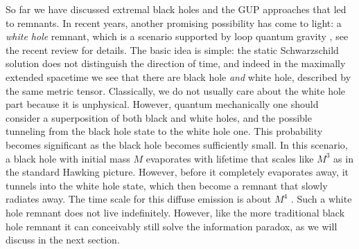 \documentclass[preprintnumbers, floatfix, preprintnumbers, letterpaper, twocolumn, superscriptaddress,nofootinbib]{revtex4-2}
\begin{document}
So far we have discussed extremal black holes and the GUP approaches that led to remnants. In recent years, another promising possibility has come to light: a \emph{white hole} remnant, which is a scenario supported by loop quantum gravity \cite{1801.03027,1802.04264,1805.03872,1905.07251,2009.05016,2105.06876,2207.06978}, see the recent review \cite{2407.09584} for details. The basic idea is simple: the static Schwarzschild solution does not distinguish the direction of time, and indeed in the maximally extended spacetime we see that there are black hole \emph{and} white hole, described by the same metric tensor. Classically, we do not usually care about the white hole part because it is unphysical. However, quantum mechanically one should consider a superposition of both black and white holes, and the possible tunneling from the black hole state to the white hole one. This probability becomes significant as the black hole becomes sufficiently small. In this scenario, a black hole with initial mass $M$ evaporates with lifetime that scales like $M^3$ as in the standard Hawking picture. However, before it completely evaporates away, it tunnels into the white hole state, which then become a remnant that slowly radiates away. The time scale for this diffuse emission is about $M^4$ \cite{2207.06978}. Such a white hole remnant does not live indefinitely. However, like the more traditional black hole remnant it can conceivably still solve the information paradox, as we will discuss in the next section. 
\end{document}
